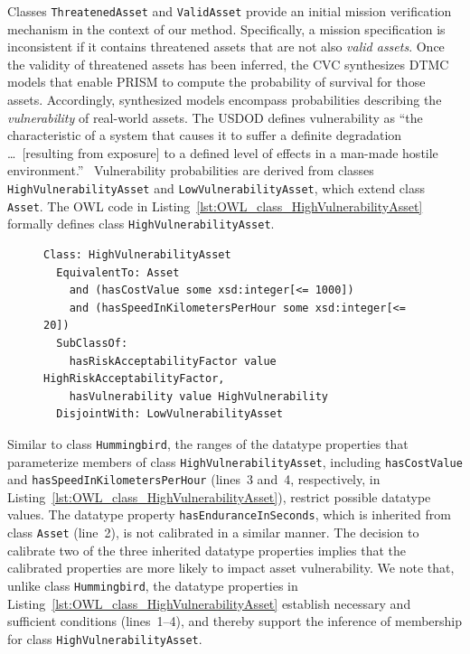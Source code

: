 Classes \texttt{ThreatenedAsset} and \texttt{ValidAsset} provide an initial mission verification mechanism in the context of our method. Specifically, a mission specification is inconsistent if it contains threatened assets that are not also \emph{valid assets}. Once the validity of threatened assets has been inferred, the CVC synthesizes DTMC models that enable PRISM to compute the probability of survival for those assets. Accordingly, synthesized models encompass probabilities describing the \emph{vulnerability} of real-world assets. The USDOD defines vulnerability as ``the characteristic of a system that causes it to suffer a definite degradation \ldots\ [resulting from exposure] to a defined level of effects in a man-made hostile environment.''~\cite{DoD_2001} Vulnerability probabilities are derived from classes \texttt{HighVulnerabilityAsset} and \texttt{LowVulnerabilityAsset}, which extend class \texttt{Asset}. The OWL code in Listing~\ref{lst:OWL_class_HighVulnerabilityAsset} formally defines class \texttt{HighVulnerabilityAsset}.

\begin{figure}[ht]
\begin{lstlisting}[caption={OWL code for class \texttt{HighVulnerabilityAsset}},label=lst:OWL_class_HighVulnerabilityAsset]
Class: HighVulnerabilityAsset
  EquivalentTo: Asset
    and (hasCostValue some xsd:integer[<= 1000])
    and (hasSpeedInKilometersPerHour some xsd:integer[<= 20])
  SubClassOf:
    hasRiskAcceptabilityFactor value HighRiskAcceptabilityFactor,
    hasVulnerability value HighVulnerability
  DisjointWith: LowVulnerabilityAsset
\end{lstlisting}
\end{figure}

Similar to class \texttt{Hummingbird}, the ranges of the datatype properties that parameterize members of class \texttt{HighVulnerabilityAsset}, including \texttt{hasCostValue} and \texttt{hasSpeedIn\-KilometersPerHour} (lines~3 and~4, respectively, in Listing~\ref{lst:OWL_class_HighVulnerabilityAsset}), restrict possible datatype values. The datatype property \texttt{hasEnduranceInSeconds}, which is inherited from class \texttt{Asset} (line~2), is not calibrated in a similar manner. The decision to calibrate two of the three inherited datatype properties implies that the calibrated properties are more likely to impact asset vulnerability. We note that, unlike class \texttt{Hummingbird}, the datatype properties in Listing~\ref{lst:OWL_class_HighVulnerabilityAsset} establish necessary and sufficient conditions (lines~1--4), and thereby support the inference of membership for class \texttt{HighVulnerabilityAsset}.

